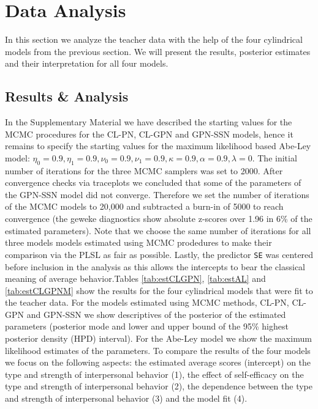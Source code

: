 \documentclass[man]{apa6}
\theoremstyle{definition}
\theoremstyle{definition}
\theoremstyle{definition}
\theoremstyle{remark}
\begin{document}
\section{Data Analysis}\label{DataAnalysis}

In this section we analyze the teacher data with the help of the four
cylindrical models from the previous section. We will present the
results, posterior estimates and their interpretation for all four
models.

\subsection{Results \& Analysis}\label{DataResults}

In the Supplementary Material we have described the starting values for
the MCMC procedures for the CL-PN, CL-GPN and GPN-SSN models, hence it
remains to specify the starting values for the maximum likelihood based
Abe-Ley model:
\(\eta_0 = 0.9, \eta_1 = 0.9, \nu_0 = 0.9, \nu_1 = 0.9, \kappa = 0.9, \alpha = 0.9, \lambda = 0\).
The initial number of iterations for the three MCMC samplers was set to
2000. After convergence checks via traceplots we concluded that some of
the parameters of the GPN-SSN model did not converge. Therefore we set
the number of iterations of the MCMC models to 20,000 and subtracted a
burn-in of 5000 to reach convergence (the geweke diagnostics show
absolute z-scores over 1.96 in 6\% of the estimated parameters). Note
that we choose the same number of iterations for all three models models
estimated using MCMC prodedures to make their comparison via the PLSL as
fair as possible. Lastly, the predictor \verb|SE| was centered before
inclusion in the analysis as this allows the intercepts to bear the
classical meaning of average behavior.\newline \indent Tables
\ref{tab:estCLGPN}, \ref{tab:estAL} and \ref{tab:estCLGPNM} show the
results for the four cylindrical models that were fit to the teacher
data. For the models estimated using MCMC methods, CL-PN, CL-GPN and
GPN-SSN we show descriptives of the posterior of the estimated
parameters (posterior mode and lower and upper bound of the 95\% highest
posterior density (HPD) interval). For the Abe-Ley model we show the
maximum likelihood estimates of the parameters. To compare the results
of the four models we focus on the following aspects: the estimated
average scores (intercept) on the type and strength of interpersonal
behavior (1), the effect of self-efficacy on the type and strength of
interpersonal behavior (2), the dependence between the type and strength
of interpersonal behavior (3) and the model fit (4).
\end{document}

